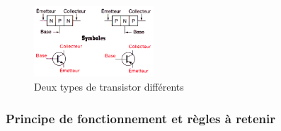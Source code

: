 \documentclass[10pt,fleqn]{article} %
\begin{document}
\begin{figure}[h]
  \centering
  \includegraphics[width=0.4\textwidth]{images/schema_transistor}
  \caption{Deux types de transistor différents}
  \label{fig:npn_pnp}
\end{figure}

\subsubsection{Principe de fonctionnement et règles à retenir}
\end{document}
